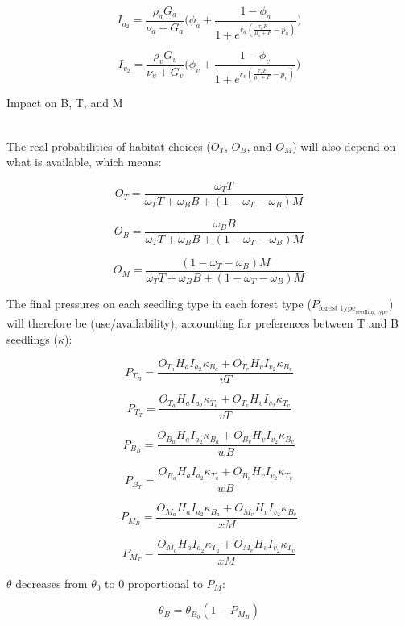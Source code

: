 \[
I_{a_2} = \frac{\rho_a G_a}{\nu_a+ G_a}
      \Big(\phi_a + \frac{1-\phi_a}{ 1+e^{r_a(\frac{\tau_a F}{\mu_a+F} - p_a)} }\Big)
\]

\[
I_{v_2} = \frac{\rho_v G_v}{\nu_v+ G_v}
      \Big(\phi_v + \frac{1-\phi_v}{ 1+e^{r_v(\frac{\tau_v F}{\mu_v+F} - p_v)}}\Big)
\]

Impact on B, T, and M

\\

The real probabilities of habitat choices ($O_T$, $O_B$, and $O_M$) will also depend on what is available, which means:

\[
O_T = \frac{\omega_T T}{\omega_T T + \omega_B B + (1-\omega_T-\omega_B) M}
\]

\[
O_B = \frac{\omega_B B}{\omega_T T + \omega_B B + (1-\omega_T-\omega_B) M}
\]

\[
O_M = \frac{(1-\omega_T-\omega_B) M}{\omega_T T + \omega_B B + (1-\omega_T-\omega_B) M}
\]

The final pressures on each seedling type in each forest type ($P_{\text{forest type}_\text{seedling type}}$) will therefore be (use/availability), accounting for preferences between T and B seedlings ($\kappa$):

\[
\boxed{
P_{T_B} = \frac{O_{T_a}H_a I_{a_2}\kappa_{B_a}+O_{T_v}H_v I_{v_2}\kappa_{B_v}}{v T}
}
\]

\[
\boxed{
P_{T_T} = \frac{O_{T_a}H_a I_{a_2}\kappa_{T_a}+O_{T_v}H_v I_{v_2}\kappa_{T_v}}{v T}
}
\]

\[
\boxed{
P_{B_B} = \frac{O_{B_a}H_a I_{a_2}\kappa_{B_a} + O_{B_v}H_v I_{v_2}\kappa_{B_v}}{w B}
}
\]

\[
\boxed{
P_{B_T} = \frac{O_{B_a}H_a I_{a_2}\kappa_{T_a} + O_{B_v}H_v I_{v_2}\kappa_{T_v}}{w B}
}
\]

\[
\boxed{
P_{M_B} = \frac{O_{M_a}H_a I_{a_2}\kappa_{B_a} + O_{M_v}H_v I_{v_2}\kappa_{B_v}}{xM}
}
\]

\[
\boxed{
P_{M_T} = \frac{O_{M_a}H_a I_{a_2}\kappa_{T_a} + O_{M_v}H_v I_{v_2}\kappa_{T_v}}{xM}
}
\]

$\theta$ decreases from $\theta_0$ to 0 
proportional to $P_M$:

\[
\theta_B = \theta_{B_0}(1-P_{M_B})
\]

